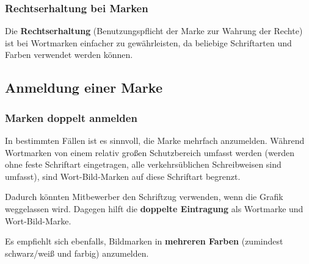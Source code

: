 \documentclass[12pt,A4]{extarticle}
\begin{document}
\subsubsection{Rechtserhaltung bei Marken}
Die \textbf{Rechtserhaltung} (Benutzungspflicht der Marke zur Wahrung der Rechte) ist bei Wortmarken einfacher zu gewährleisten, da beliebige Schriftarten und Farben verwendet werden können.

\subsection{Anmeldung einer Marke}
\subsubsection{Marken doppelt anmelden}
In bestimmten Fällen ist es sinnvoll, die Marke mehrfach anzumelden.
Während Wortmarken von einem relativ großen Schutzbereich umfasst werden (werden ohne feste Schriftart eingetragen, alle verkehrsüblichen Schreibweisen sind umfasst),
sind Wort-Bild-Marken auf diese Schriftart begrenzt.\par
Dadurch könnten Mitbewerber den Schriftzug verwenden, wenn die Grafik weggelassen wird. Dagegen hilft die \textbf{doppelte Eintragung} als Wortmarke und Wort-Bild-Marke.\par
Es empfiehlt sich ebenfalls, Bildmarken in \textbf{mehreren Farben} (zumindest schwarz/weiß und farbig) anzumelden.
\end{document}
